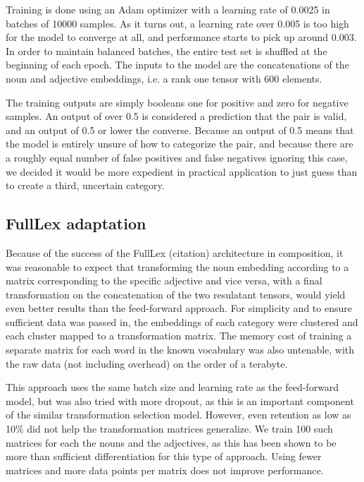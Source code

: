 \documentclass[a4paper, 11pt]{scrartcl}
\begin{document}
Training is done using an Adam optimizer with a learning rate of 0.0025 in batches of 10000 samples. As it turns out, a learning rate over 0.005 is too high for the model to converge at all, and performance starts to pick up around 0.003. In order to maintain balanced batches, the entire test set is shuffled at the beginning of each epoch. The inputs to the model are the concatenations of the noun and adjective embeddings, i.e. a rank one tensor with 600 elements.

The training outputs are simply booleans \textemdash one for positive and zero for negative samples. An output of over 0.5 is considered a prediction that the pair is valid, and an output of 0.5 or lower the converse. Because an output of 0.5 means that the model is entirely unsure of how to categorize the pair, and because there are a roughly equal number of false positives and false negatives ignoring this case, we decided it would be more expedient in practical application to just guess than to create a third, uncertain category.

\subsection{FullLex adaptation}
Because of the success of the FullLex (citation) architecture in composition, it was reasonable to expect that transforming the noun embedding according to a matrix corresponding to the specific adjective and vice versa, with a final transformation on the concatenation of the two resulatant tensors, would yield even better results than the feed-forward approach. For simplicity and to ensure sufficient data was passed in, the embeddings of each category were clustered and each cluster mapped to a transformation matrix. The memory cost of training a separate matrix for each word in the known vocabulary was also untenable, with the raw data (not including overhead) on the order of a terabyte.

This approach uses the same batch size and learning rate as the feed-forward model, but was also tried with more dropout, as this is an important component of the similar transformation selection model. However, even retention as low as 10\% did not help the transformation matrices generalize. We train 100 such matrices for each the nouns and the adjectives, as this has been shown to be more than sufficient differentiation for this type of approach. Using fewer matrices and more data points per matrix does not improve performance.
\end{document}
